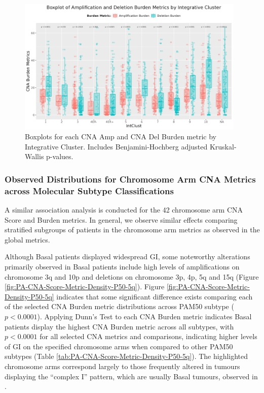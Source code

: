 \begin{figure}[!ht]
\center
\includegraphics[width=0.97\textwidth]{../figures/Chapter_2/Global_CNA_Burden_AmpDel_Across_IC.png}
\caption[Boxplots for each CNA Amp and CNA Del Burden metric by Integrative Cluster.]{Boxplots for each CNA Amp and CNA Del Burden metric by Integrative Cluster. Includes Benjamini-Hochberg adjusted Kruskal-Wallis p-values.}
\label{fig:CNA-Burden-Metric-Boxplots-IC-AmpDel}
\end{figure}
\clearpage 

\subsubsection{Observed Distributions for Chromosome Arm CNA Metrics across Molecular Subtype Classifications}
\label{ObsDis1}
A similar association analysis is conducted for the 42 chromosome arm CNA Score and Burden metrics. In general, we observe similar effects comparing stratified subgroups of patients in the chromosome arm metrics as observed in the global metrics. 

Although Basal patients displayed widespread GI, some noteworthy alterations primarily observed in Basal patients include high levels of amplifications on chromosome 3q and 10p and deletions on chromosome 3p, 4p, 5q and 15q (Figure \ref{fig:PA-CNA-Score-Metric-Density-P50-5q}). Figure \ref{fig:PA-CNA-Score-Metric-Density-P50-5q} indicates that some significant difference exists comparing each of the selected CNA Burden metric distributions across PAM50 subtype ($p<0.0001$). Applying Dunn's Test to each CNA Burden metric indicates Basal patients display the highest CNA Burden metric across all subtypes, with $p<0.0001$ for all selected CNA metrics and comparisons, indicating higher levels of GI on the specified chromosome arms when compared to other PAM50 subtypes (Table \ref{tab:PA-CNA-Score-Metric-Density-P50-5q}). The highlighted chromosome arms correspond largely to those frequently altered in tumours displaying the “complex I” pattern, which are usually Basal tumours, observed in \cite{pmid17142309}.

